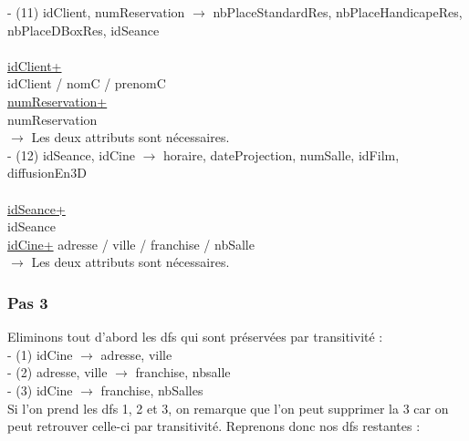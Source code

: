 \documentclass[a4paper,sffamily,12pt]{article}
\begin{document}
				\noindent - (11) idClient, numReservation $\rightarrow$ nbPlaceStandardRes, nbPlaceHandicapeRes, nbPlaceDBoxRes, idSeance \\
					\\
					\underline{idClient+} \\
					idClient / nomC / prenomC \\
					\underline{numReservation+} \\
					numReservation \\	
				$\rightarrow$ Les deux attributs sont nécessaires. \\					
				
				\noindent - (12) idSeance, idCine $\rightarrow$ horaire, dateProjection, numSalle, idFilm, diffusionEn3D \\												
					\\
					\underline{idSeance+}\\
					idSeance \\
					\underline{idCine+}
					adresse / ville / franchise / nbSalle \\
				$\rightarrow$ Les deux attributs sont nécessaires. \\

				\vspace{0.5cm}

			\subsubsection{Pas 3}		
	
				\vspace{0.5cm}
	
				\noindent Eliminons tout d'abord les dfs qui sont préservées par transitivité : \\
	
					\noindent- (1) idCine $\rightarrow$ adresse, ville \\
					- (2) adresse, ville $\rightarrow$ franchise, nbsalle \\
					- (3) idCine $\rightarrow$ franchise, nbSalles \\
					
				Si l'on prend les dfs 1, 2 et 3, on remarque que l'on peut supprimer la 3 car on peut retrouver celle-ci par transitivité. Reprenons donc nos dfs restantes : \\
					
\end{document}
